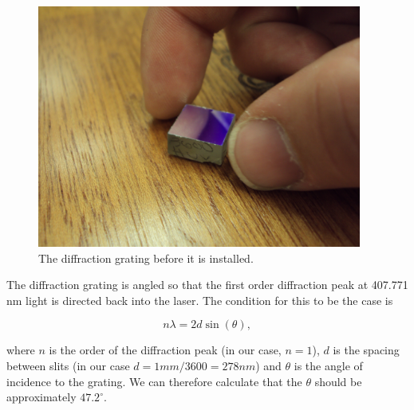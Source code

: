 \begin{figure}
\centerline{
\includegraphics[width=0.95\textwidth]{diffractionGrating.JPG}}
\caption[Photograph of Diffraction Grating]{\label{diffractionGratingPhoto} The diffraction grating before it is installed.}
\end{figure}

The diffraction grating is angled so that the first order diffraction peak at 407.771 nm light is directed back into the laser. The condition for this to be the case is 

\begin{equation} \label{gratingEQn}
n \lambda = 2 d \sin (\theta),
\end{equation}

where $n$ is the order of the diffraction peak (in our case, $n=1$), $d$ is the spacing between slits (in our case $d=1 mm/3600 = 278 nm$) and $\theta$ is the angle of incidence to the grating. We can therefore calculate that the $\theta$ should be approximately
\href{http://www.wolframalpha.com/input/?i=arcsin%28+407.771+nm+%2F%282*%281+mm%2F3600%29%29%29+in+degrees}{$47.2^\circ$}.

